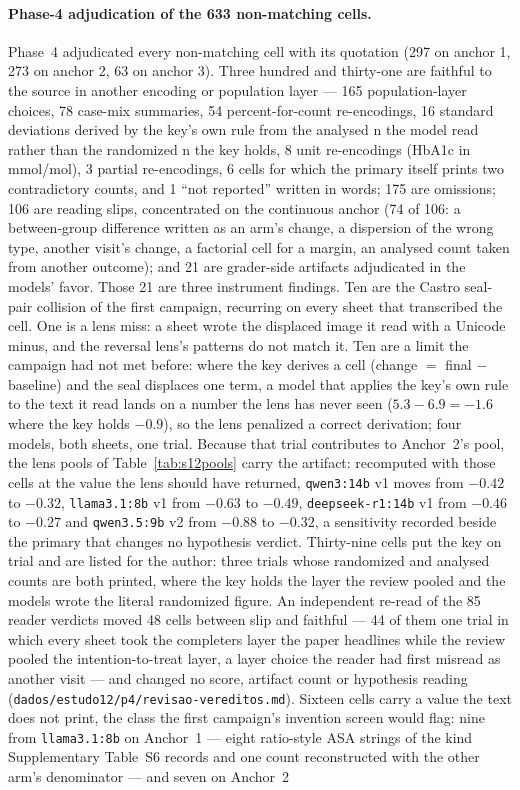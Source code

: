 \documentclass[11pt]{article}
\begin{document}
\paragraph{Phase-4 adjudication of the 633 non-matching cells.} Phase~4 adjudicated every non-matching cell with its quotation (297 on anchor 1, 273 on anchor 2, 63 on anchor 3). Three hundred and thirty-one are faithful to the source in another encoding or population layer --- 165 population-layer choices, 78 case-mix summaries, 54 percent-for-count re-encodings, 16 standard deviations derived by the key's own rule from the analysed n the model read rather than the randomized n the key holds, 8 unit re-encodings (HbA1c in mmol/mol), 3 partial re-encodings, 6 cells for which the primary itself prints two contradictory counts, and 1 ``not reported'' written in words; 175 are omissions; 106 are reading slips, concentrated on the continuous anchor (74 of 106: a between-group difference written as an arm's change, a dispersion of the wrong type, another visit's change, a factorial cell for a margin, an analysed count taken from another outcome); and 21 are grader-side artifacts adjudicated in the models' favor. Those 21 are three instrument findings. Ten are the Castro seal-pair collision of the first campaign, recurring on every sheet that transcribed the cell. One is a lens miss: a sheet wrote the displaced image it read with a Unicode minus, and the reversal lens's patterns do not match it. Ten are a limit the campaign had not met before: where the key derives a cell (change $=$ final $-$ baseline) and the seal displaces one term, a model that applies the key's own rule to the text it read lands on a number the lens has never seen ($5.3 - 6.9 = -1.6$ where the key holds $-0.9$), so the lens penalized a correct derivation; four models, both sheets, one trial. Because that trial contributes to Anchor~2's pool, the lens pools of Table~\ref{tab:s12pools} carry the artifact: recomputed with those cells at the value the lens should have returned, \texttt{qwen3:14b} v1 moves from $-0.42$ to $-0.32$, \texttt{llama3.1:8b} v1 from $-0.63$ to $-0.49$, \texttt{deepseek-r1:14b} v1 from $-0.46$ to $-0.27$ and \texttt{qwen3.5:9b} v2 from $-0.88$ to $-0.32$, a sensitivity recorded beside the primary that changes no hypothesis verdict. Thirty-nine cells put the key on trial and are listed for the author: three trials whose randomized and analysed counts are both printed, where the key holds the layer the review pooled and the models wrote the literal randomized figure. An independent re-read of the 85 reader verdicts moved 48 cells between slip and faithful --- 44 of them one trial in which every sheet took the completers layer the paper headlines while the review pooled the intention-to-treat layer, a layer choice the reader had first misread as another visit --- and changed no score, artifact count or hypothesis reading (\texttt{dados/estudo12/p4/revisao-vereditos.md}). Sixteen cells carry a value the text does not print, the class the first campaign's invention screen would flag: nine from \texttt{llama3.1:8b} on Anchor~1 --- eight ratio-style ASA strings of the kind Supplementary Table~S6 records and one count reconstructed with the other arm's denominator --- and seven on Anchor~2 
\end{document}

